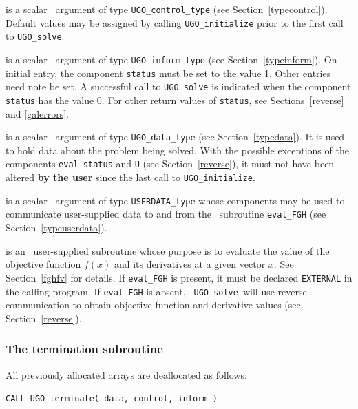 \documentclass{galahad}
\newcommand{\packagename}{UGO}
\newcommand{\fullpackagename}{\libraryname\_\packagename}
\newcommand{\solver}{{\tt \fullpackagename\_solve}}
\begin{document}
\begin{description}
 is a scalar \intentin\ argument of type
{\tt \packagename\_control\_type}
(see Section~\ref{typecontrol}). Default values may be assigned by calling
{\tt \packagename\_initialize} prior to the first call to
{\tt \packagename\_solve}.

 is a scalar \intentinout\ argument of type
{\tt \packagename\_inform\_type}
(see Section~\ref{typeinform}).
On initial entry, the  component {\tt status} must be set to the value 1.
Other entries need note be set.
A successful call to
{\tt \packagename\_solve}
is indicated when the  component {\tt status} has the value 0.
For other return values of {\tt status}, see Sections~\ref{reverse} and
\ref{galerrors}.

 is a scalar \intentinout\ argument of type
{\tt \packagename\_data\_type}
(see Section~\ref{typedata}). It is used to hold data about the problem being
solved. With the possible exceptions of the components
{\tt eval\_status} and {\tt U} (see Section~\ref{reverse}),
it must not have been altered {\bf by the user} since the last call to
{\tt \packagename\_initialize}.

 is a scalar \intentinout\ argument of type
{\tt USERDATA\_type} whose components may be used
to communicate user-supplied data to and from the
\optional\ subroutine {\tt eval\_FGH}
(see Section~\ref{typeuserdata}).

 is an \optional\
user-supplied subroutine whose purpose is to evaluate the value of the
objective function $f(x)$ and its derivatives at a given vector $x$.
See Section~\ref{fghfv} for details. If {\tt eval\_FGH} is present,
it must be declared {\tt EXTERNAL} in the calling program.
If {\tt eval\_FGH} is absent, \solver\ will use reverse communication to
obtain objective function and derivative values (see Section~\ref{reverse}).

\end{description}


\subsubsection{The  termination subroutine}
All previously allocated arrays are deallocated as follows:
\vspace*{1mm}

\hspace{8mm}
{\tt CALL \packagename\_terminate( data, control, inform )}
\end{document}
